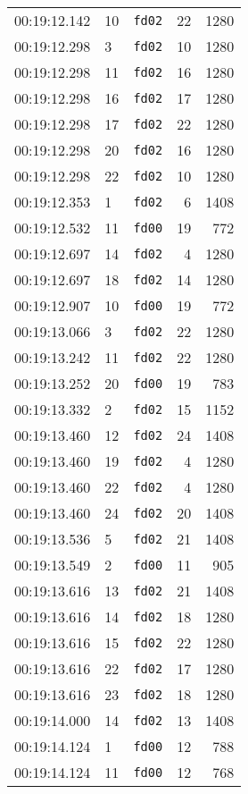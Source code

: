 \documentclass{article}
\begin{document}
\begin{longtable}{lllrr}
00:19:12.142 & 10 & \texttt{fd02} & 22 & 1280 \\
00:19:12.298 & 3 & \texttt{fd02} & 10 & 1280 \\
00:19:12.298 & 11 & \texttt{fd02} & 16 & 1280 \\
00:19:12.298 & 16 & \texttt{fd02} & 17 & 1280 \\
00:19:12.298 & 17 & \texttt{fd02} & 22 & 1280 \\
00:19:12.298 & 20 & \texttt{fd02} & 16 & 1280 \\
00:19:12.298 & 22 & \texttt{fd02} & 10 & 1280 \\
00:19:12.353 & 1 & \texttt{fd02} & 6 & 1408 \\
00:19:12.532 & 11 & \texttt{fd00} & 19 & 772 \\
00:19:12.697 & 14 & \texttt{fd02} & 4 & 1280 \\
00:19:12.697 & 18 & \texttt{fd02} & 14 & 1280 \\
00:19:12.907 & 10 & \texttt{fd00} & 19 & 772 \\
00:19:13.066 & 3 & \texttt{fd02} & 22 & 1280 \\
00:19:13.242 & 11 & \texttt{fd02} & 22 & 1280 \\
00:19:13.252 & 20 & \texttt{fd00} & 19 & 783 \\
00:19:13.332 & 2 & \texttt{fd02} & 15 & 1152 \\
00:19:13.460 & 12 & \texttt{fd02} & 24 & 1408 \\
00:19:13.460 & 19 & \texttt{fd02} & 4 & 1280 \\
00:19:13.460 & 22 & \texttt{fd02} & 4 & 1280 \\
00:19:13.460 & 24 & \texttt{fd02} & 20 & 1408 \\
00:19:13.536 & 5 & \texttt{fd02} & 21 & 1408 \\
00:19:13.549 & 2 & \texttt{fd00} & 11 & 905 \\
00:19:13.616 & 13 & \texttt{fd02} & 21 & 1408 \\
00:19:13.616 & 14 & \texttt{fd02} & 18 & 1280 \\
00:19:13.616 & 15 & \texttt{fd02} & 22 & 1280 \\
00:19:13.616 & 22 & \texttt{fd02} & 17 & 1280 \\
00:19:13.616 & 23 & \texttt{fd02} & 18 & 1280 \\
00:19:14.000 & 14 & \texttt{fd02} & 13 & 1408 \\
00:19:14.124 & 1 & \texttt{fd00} & 12 & 788 \\
00:19:14.124 & 11 & \texttt{fd00} & 12 & 768 \\

\end{longtable}
\end{document}
